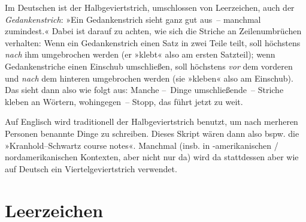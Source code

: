 Im Deutschen ist der Halbgeviertstrich, umschlossen von Leerzeichen,
auch der \emph{Gedankenstrich}: »Ein Gedankenstrich sieht ganz gut
aus~-- manchmal zumindest.«  Dabei ist darauf zu achten, wie sich die
Striche an Zeilenumbrüchen verhalten: Wenn ein Gedankenstrich einen
Satz in zwei Teile teilt, soll höchstens \emph{nach} ihm umgebrochen
werden (er »klebt« also am ersten Satzteil); wenn Gedankenstriche
einen Einschub umschließen, soll höchstens \emph{vor} dem vorderen und
\emph{nach} dem hinteren umgebrochen werden (sie »kleben« also am
Einschub).  Das sieht dann also wie folgt aus:  Manche --~Dinge
umschließende~-- Striche kleben an Wörtern, wohingegen~--
Stopp, das führt jetzt zu weit.

Auf Englisch wird traditionell der Halbgeviertstrich benutzt, um nach
merheren Personen benannte Dinge zu schreiben.  Dieses Skript wären
dann also bspw. die »\foreignlanguage{british}{Kranhold--Schwartz
  course notes}«.  Manchmal (insb. in -amerikanischen /
nordamerikanischen Kontexten, aber nicht nur da) wird da stattdessen
aber wie auf Deutsch ein Viertelgeviertstrich verwendet.

\section{Leerzeichen}

